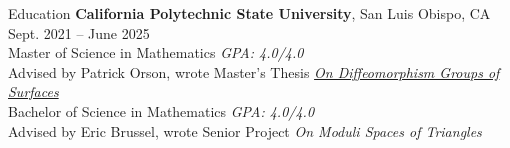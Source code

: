 \documentclass[
	11pt, %
]{cv} %
\begin{document}
\begin{rSection}{Education}
	\textbf{California Polytechnic State University}, San Luis Obispo, CA \hfill Sept. 2021 -- June 2025 \\
	Master of Science in  Mathematics \hfill \textit{GPA: 4.0/4.0} \\
	\-\hspace{1cm}Advised by Patrick Orson, wrote Master's Thesis \href{https://digitalcommons.calpoly.edu/theses/3005/}{\textit{On Diffeomorphism Groups of Surfaces}}\\
	Bachelor of Science in Mathematics \hfill \textit{GPA: 4.0/4.0} \\
	\-\hspace{1cm}Advised by Eric Brussel, wrote Senior Project \textit{On Moduli Spaces of Triangles}
\end{rSection}
\end{document}
